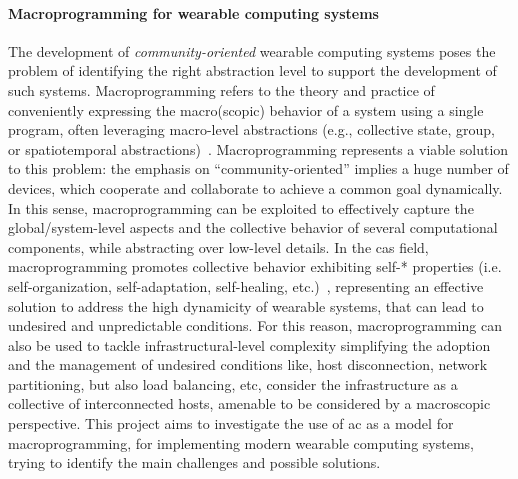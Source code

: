 \documentclass[12pt,a4paper]{article}
\begin{document}
\paragraph{Macroprogramming for wearable computing systems}\label{sec:macro-prog}
The development of \emph{community-oriented} wearable computing systems poses the problem of identifying the right abstraction level to support the development of such systems.
%
Macroprogramming refers to the theory and practice of conveniently expressing the macro(scopic) behavior of a system using a single program, often leveraging macro-level abstractions (e.g., collective state, group, or spatiotemporal abstractions)~\cite{DBLP:journals/corr/abs-2201-03473}.
%
Macroprogramming represents a viable solution to this problem:
the emphasis on ``community-oriented'' implies a huge number of devices,
which cooperate and collaborate to achieve a common goal dynamically.
%
In this sense,
macroprogramming can be exploited to effectively capture the global/system-level aspects and the collective behavior of several computational components,
while abstracting over low-level details.
%
In the \ac{cas} field,
macroprogramming promotes collective behavior exhibiting self-* properties (i.e. self-organization, self-adaptation, self-healing, etc.)~\cite{DBLP:conf/dagstuhl/LemosGMSABBBBCD10, DBLP:journals/computer/KephartC03},
representing an effective solution to address the high dynamicity of wearable systems,
that can lead to undesired and unpredictable conditions.
%
For this reason,
macroprogramming can also be used to tackle infrastructural-level complexity simplifying the adoption and the management of undesired conditions like,
host disconnection, network partitioning, but also load balancing, etc,
consider the infrastructure as a collective of interconnected hosts, amenable to be considered by a macroscopic perspective.
%
This project aims to investigate the use of \ac{ac} as a model for macroprogramming,
for implementing modern wearable computing systems,
trying to identify the main challenges and possible solutions.
\end{document}
